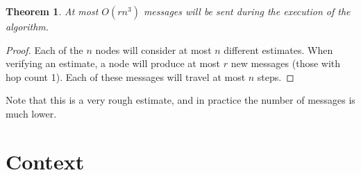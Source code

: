 \documentclass[a4paper,12pt]{article}
\newtheorem{theorem}{Theorem}
\begin{document}
\begin{theorem}
At most $O(rn^3)$ messages will be sent during the execution of the algorithm.
\end{theorem}
\begin{proof}
Each of the $n$ nodes will consider at most $n$ different estimates. When verifying an estimate, a node will produce at most $r$ new messages (those with hop count 1). Each of these messages will travel at most $n$ steps.
\end{proof}
Note that this is a very rough estimate, and in practice the number of messages is much lower.

\section{Context}
\end{document}
